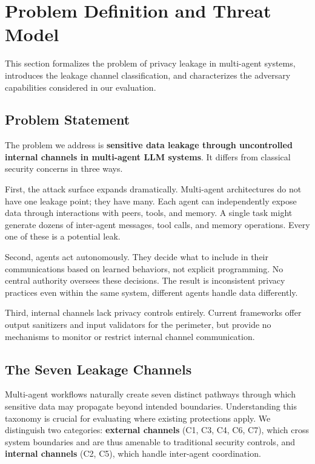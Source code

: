 \documentclass{ieeeaccess}
\begin{document}
\section{Problem Definition and Threat Model}
\label{sec:threat}

This section formalizes the problem of privacy leakage in multi-agent systems, introduces the leakage channel classification, and characterizes the adversary capabilities considered in our evaluation.

\subsection{Problem Statement}

The problem we address is \textbf{sensitive data leakage through uncontrolled internal channels in multi-agent LLM systems}. It differs from classical security concerns in three ways.

First, the attack surface expands dramatically. Multi-agent architectures do not have one leakage point; they have many. Each agent can independently expose data through interactions with peers, tools, and memory. A single task might generate dozens of inter-agent messages, tool calls, and memory operations. Every one of these is a potential leak.

Second, agents act autonomously. They decide what to include in their communications based on learned behaviors, not explicit programming. No central authority oversees these decisions. The result is inconsistent privacy practices even within the same system, different agents handle data differently.

Third, internal channels lack privacy controls entirely. Current frameworks offer output sanitizers and input validators for the perimeter, but provide no mechanisms to monitor or restrict internal channel communication.

\subsection{The Seven Leakage Channels}

Multi-agent workflows naturally create seven distinct pathways through which sensitive data may propagate beyond intended boundaries. Understanding this taxonomy is crucial for evaluating where existing protections apply. We distinguish two categories: \textbf{external channels} (C1, C3, C4, C6, C7), which cross system boundaries and are thus amenable to traditional security controls, and \textbf{internal channels} (C2, C5), which handle inter-agent coordination.
\end{document}
